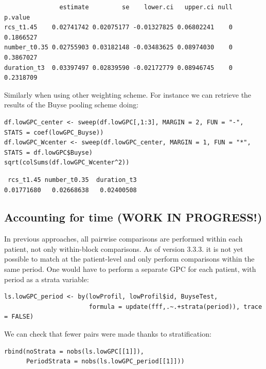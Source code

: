 \documentclass[12pt]{article}
\begin{document}
\begin{verbatim}
               estimate         se    lower.ci   upper.ci null   p.value
rcs_t1.45    0.02741742 0.02075177 -0.01327825 0.06802241    0 0.1866527
number_t0.35 0.02755903 0.03182148 -0.03483625 0.08974030    0 0.3867027
duration_t3  0.03397497 0.02839590 -0.02172779 0.08946745    0 0.2318709
\end{verbatim}


\noindent  Similarly when using other weighting scheme. For instance we can
retrieve the results of the Buyse pooling scheme doing:
\lstset{language=r,label= ,caption= ,captionpos=b,numbers=none}
\begin{lstlisting}
df.lowGPC_center <- sweep(df.lowGPC[,1:3], MARGIN = 2, FUN = "-", STATS = coef(lowGPC_Buyse))
df.lowGPC_Wcenter <- sweep(df.lowGPC_center, MARGIN = 1, FUN = "*", STATS = df.lowGPC$Buyse)
sqrt(colSums(df.lowGPC_Wcenter^2))
\end{lstlisting}

\begin{verbatim}
 rcs_t1.45 number_t0.35  duration_t3 
0.01771680   0.02668638   0.02400508
\end{verbatim}


\clearpage

\subsection{Accounting for time (WORK IN PROGRESS!)}
\label{sec:orgbebbb17}

In previous approaches, all pairwise comparisons are performed within
each patient, not only within-block comparisons. As of version
3.3.3. it is not yet possible to match at the patient-level and only
perform comparisons within the same period. One would have to perform
a separate GPC for each patient, with period as a strata variable:

\lstset{language=r,label= ,caption= ,captionpos=b,numbers=none}
\begin{lstlisting}
ls.lowGPC_period <- by(lowProfil, lowProfil$id, BuyseTest,
                       formula = update(fff,.~.+strata(period)), trace = FALSE)
\end{lstlisting}

We can check that fewer pairs were made thanks to stratification:
\lstset{language=r,label= ,caption= ,captionpos=b,numbers=none}
\begin{lstlisting}
rbind(noStrata = nobs(ls.lowGPC[[1]]),
      PeriodStrata = nobs(ls.lowGPC_period[[1]]))
\end{lstlisting}
\end{document}
